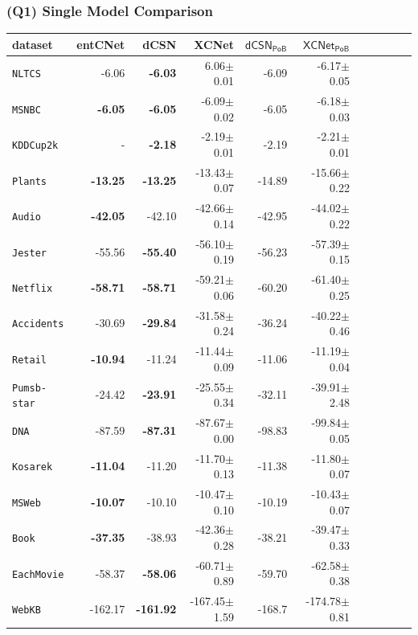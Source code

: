 \documentclass[xcolor={usenames,dvipsnames,svgnames}, compress]{beamer}
\begin{document}
\begin{frame}[t]
  \frametitle{(Q1) Single Model Comparison}
      \begin{table}[t]
  \tiny
  \centering
  \setlength{\tabcolsep}{3pt}  
  \begin{tabular}{l rrrrrrrrrr}
    dataset & \tiny\textsf{entCNet} & \tiny\textsf{dCSN} & \tiny\textsf{XCNet} & \tiny$\mathsf{dCSN_{PoB}}$ & \tiny$\mathsf{XCNet_{PoB}}$\\
    \midrule
    \texttt{NLTCS}        &-6.06 &\textbf{-6.03}&6.06$\pm$0.01&-6.09&-6.17$\pm$0.05\\
    \texttt{MSNBC}        &\textbf{-6.05}&\textbf{-6.05}&-6.09$\pm$0.02&-6.05&-6.18$\pm$0.03\\
    \texttt{KDDCup2k}     & - &\textbf{-2.18}&-2.19$\pm$0.01&-2.19&-2.21$\pm$0.01\\
    \texttt{Plants}       &\textbf{-13.25}&\textbf{-13.25}&-13.43$\pm$0.07&-14.89&-15.66$\pm$0.22\\
    \texttt{Audio}        &\textbf{-42.05}&-42.10&-42.66$\pm$0.14&-42.95&-44.02$\pm$0.22\\
    \texttt{Jester}       &-55.56&\textbf{-55.40}&-56.10$\pm$0.19&-56.23&-57.39$\pm$0.15\\
    \texttt{Netflix}      &\textbf{-58.71}&\textbf{-58.71}&-59.21$\pm$0.06&-60.20&-61.40$\pm$0.25\\
    \texttt{Accidents}    &-30.69&\textbf{-29.84}& -31.58$\pm$0.24 &-36.24&-40.22$\pm$0.46\\
    \texttt{Retail}       &\textbf{-10.94}&-11.24&-11.44$\pm$0.09&-11.06&-11.19$\pm$0.04\\
    \texttt{Pumsb-star}   &-24.42&\textbf{-23.91}&-25.55$\pm$0.34&-32.11&-39.91$\pm$2.48\\
    \texttt{DNA}          &-87.59&\textbf{-87.31}&-87.67$\pm$0.00&-98.83&-99.84$\pm$0.05\\
    \texttt{Kosarek}      &\textbf{-11.04}&-11.20&-11.70$\pm$0.13&-11.38&-11.80$\pm$0.07\\
    \texttt{MSWeb}        &\textbf{-10.07}&-10.10&-10.47$\pm$0.10&-10.19&-10.43$\pm$0.07\\
    \texttt{Book}         &\textbf{-37.35}&-38.93&-42.36$\pm$0.28&-38.21&-39.47$\pm$0.33\\
    \texttt{EachMovie}    &-58.37&\textbf{-58.06}&-60.71$\pm$0.89&-59.70&-62.58$\pm$0.38\\
    \texttt{WebKB}        &-162.17&\textbf{-161.92}&-167.45$\pm$1.59&-168.7&-174.78$\pm$0.81\\

\end{tabular}
\end{table}
\end{frame}
\end{document}
